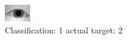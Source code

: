 \begin{figure}[h!]
\begin{center}
\includegraphics[width=0.60\columnwidth]{figures/ID918_class_1_target_2.png}
\end{center}
\caption{ Classification: 1 actual target: 2}
\label{fig:ID918_class_1_target_2}
\end{figure}
